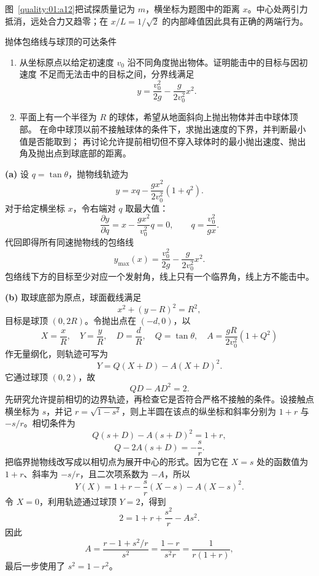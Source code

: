 {\begin{xesolution}

图~\ref{quality:01:a12}把试探质量记为 $m$，横坐标为题图中的距离 $x$。中心处两引力抵消，远处合力又趋零；在 $x/L=1/\sqrt2$ 的内部峰值因此具有正确的两端行为。
\end{xesolution}

\begin{origexamplebox}{抛体包络线与球顶的可达条件}\label{ch01:ex:s14-1-9}
\begin{enumerate}[label=(\alph*),leftmargin=2.2em]
 \item 从坐标原点以给定初速度 $v_0$ 沿不同角度抛出物体。证明能击中的目标与因初速度
 不足而无法击中的目标之间，分界线满足
 \[
  y=\frac{v_0^2}{2g}-\frac{g}{2v_0^2}x^2.
 \]
 \item 平面上有一个半径为 $R$ 的球体，希望从地面斜向上抛出物体并击中球体顶部。
 在命中球顶以前不接触球体的条件下，求抛出速度的下界，并判断最小值是否能取到；
 再讨论允许提前相切但不穿入球体时的最小抛出速度、抛出角及抛出点到球底部的距离。
\end{enumerate}

\end{origexamplebox}

\begin{xesolution}
\textbf{(a)} 设 $q=\tan\theta$，抛物线轨迹为
\[
 y=xq-\frac{gx^2}{2v_0^2}(1+q^2).
\]
对于给定横坐标 $x$，令右端对 $q$ 取最大值：
\[
 \frac{\partial y}{\partial q}=x-\frac{gx^2}{v_0^2}q=0,\qquad
 q=\frac{v_0^2}{gx}.
\]
代回即得所有同速抛物线的包络线
\[
 \boxed{y_{\max}(x)=\frac{v_0^2}{2g}-\frac{g}{2v_0^2}x^2}.
\]
包络线下方的目标至少对应一个发射角，线上只有一个临界角，线上方不能击中。

\textbf{(b)} 取球底部为原点，球面截线满足
\[
 x^2+(y-R)^2=R^2,
\]
目标是球顶 $(0,2R)$。令抛出点在 $(-d,0)$，以
\[
 X=\frac{x}{R},\quad Y=\frac{y}{R},\quad D=\frac dR,
 \quad Q=\tan\theta,
 \quad A=\frac{gR}{2v_0^2}(1+Q^2)
\]
作无量纲化，则轨迹可写为
\[
 Y=Q(X+D)-A(X+D)^2.
\]
它通过球顶 $(0,2)$，故
\begin{equation}\label{ch01:eq:sphere-top}
 QD-AD^2=2.
\end{equation}
先研究允许提前相切的边界轨迹，再检查它是否符合严格不接触的条件。设接触点
横坐标为 $s$，并记 $r=\sqrt{1-s^2}$，则上半圆在该点的纵坐标和斜率分别为
$1+r$ 与 $-s/r$。相切条件为
\begin{equation}\label{ch01:eq:sphere-tangent-point}
 Q(s+D)-A(s+D)^2=1+r,
\end{equation}
\begin{equation}\label{ch01:eq:sphere-tangent-slope}
 Q-2A(s+D)=-\frac{s}{r}.
\end{equation}
把临界抛物线改写成以相切点为展开中心的形式。因为它在
$X=s$ 处的函数值为 $1+r$、斜率为 $-s/r$，且二次项系数为 $-A$，所以
\[
 Y(X)=1+r-\frac{s}{r}(X-s)-A(X-s)^2.
\]
令 $X=0$，利用轨迹通过球顶 $Y=2$，得到
\[
 2=1+r+\frac{s^2}{r}-As^2.
\]
因此
\[
 A=\frac{r-1+s^2/r}{s^2}
 =\frac{1-r}{s^2r}
 =\frac{1}{r(1+r)},
\]
最后一步使用了 $s^2=1-r^2$。


\end{xesolution}}
